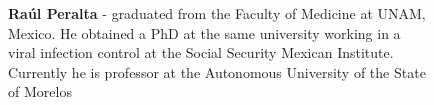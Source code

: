 \documentclass[11pt,a4paper,reqno]{amsart}
\theoremstyle{definition}
\theoremstyle{remark}
\begin{document}
\begin{figure}[ht!]
\begin{minipage}[b]{0.5\linewidth}
\vspace{0.1cm}
\qquad\qquad\qquad{}
\end{minipage}
\begin{minipage}[b]{7cm}
\bigskip \bigskip\footnotesize{\textbf{Raúl Peralta}
        - graduated from the Faculty of Medicine at UNAM, Mexico. He obtained a PhD at the same university working in a viral infection control at the Social Security Mexican Institute. Currently he is professor at the Autonomous University of the State of Morelos}\end{minipage}\\
\end{figure}
\end{document}
